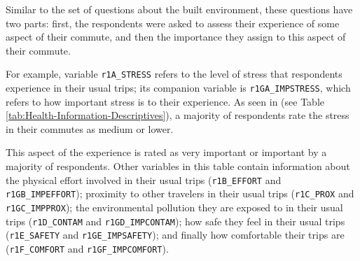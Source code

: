 \documentclass[
11pt, %
oneside, %
english, %
singlespacing, %
]{macthesis} %
\begin{document}
Similar to the set of questions about the built environment, these questions have two parts: first, the respondents were asked to assess their experience of some aspect of their commute, and then the importance they assign to this aspect of their commute.

For example, variable \texttt{r1A\_STRESS} refers to the level of stress that respondents experience in their usual trips; its companion variable is \texttt{r1GA\_IMPSTRESS}, which refers to how important stress is to their experience. As seen in (see Table \ref{tab:Health-Information-Descriptives}), a majority of respondents rate the stress in their commutes as medium or lower.

This aspect of the experience is rated as very important or important by a majority of respondents. Other variables in this table contain information about the physical effort involved in their usual trips (\texttt{r1B\_EFFORT} and \texttt{r1GB\_IMPEFFORT}); proximity to other travelers in their usual trips (\texttt{r1C\_PROX} and \texttt{r1GC\_IMPPROX}); the environmental pollution they are exposed to in their usual trips (\texttt{r1D\_CONTAM} and \texttt{r1GD\_IMPCONTAM}); how safe they feel in their usual trips (\texttt{r1E\_SAFETY} and \texttt{r1GE\_IMPSAFETY}); and finally how comfortable their trips are (\texttt{r1F\_COMFORT} and \texttt{r1GF\_IMPCOMFORT}).
\end{document}

